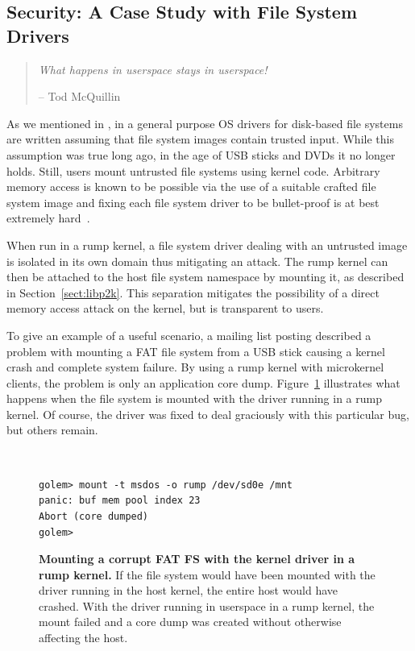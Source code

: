 \subsection{Security: A Case Study with File System Drivers}
\label{sect:securitycase}

\begin{quote}
\emph{What happens in userspace stays in userspace!}

-- Tod McQuillin
\end{quote}

As we mentioned in , in a general purpose OS
drivers for disk-based file systems are written assuming that file
system images contain trusted input.  While this assumption was true long ago,
in the age of USB sticks and DVDs it no longer holds.  Still, users
mount untrusted file systems using kernel code.  Arbitrary
memory access is known to be possible via the use of a suitable crafted
file system image and fixing each file system driver to
be bullet-proof is at best extremely hard~\cite{yang:exe}.

When run in a rump kernel, a file system driver dealing with an
untrusted image is isolated in its own domain thus mitigating an
attack.  The rump kernel can then be attached to the host file
system namespace by mounting it, as described in Section~\ref{sect:libp2k}.
This separation mitigates the possibility of a direct memory access attack on
the kernel, but is transparent to users.

To give an example of a useful scenario, a mailing list posting
described a problem with mounting a FAT file system from a USB
stick causing a kernel crash and complete system failure.  By using
a rump kernel with microkernel clients, the problem is only an
application core dump.  Figure~\ref{fig:msdoscrash} illustrates
what happens when the file system is mounted with the driver running
in a rump kernel.  Of course, the driver was fixed to deal graciously
with this particular bug, but others remain.

\begin{figure}[t]
{\tt \small
\begin{verbatim}
golem> mount -t msdos -o rump /dev/sd0e /mnt
panic: buf mem pool index 23
Abort (core dumped)
golem>
\end{verbatim}}
\caption[Mounting a corrupt FAT FS with the kernel driver in a rump kernel]{
\textbf{Mounting a corrupt FAT FS with the kernel driver in a rump kernel.}
If the file system would have been mounted with the driver running in the
host kernel, the entire host would have crashed.  With the driver running
in userspace in a rump kernel, the mount failed and a core dump was created
without otherwise affecting the host.
}
\label{fig:msdoscrash}
\end{figure}

